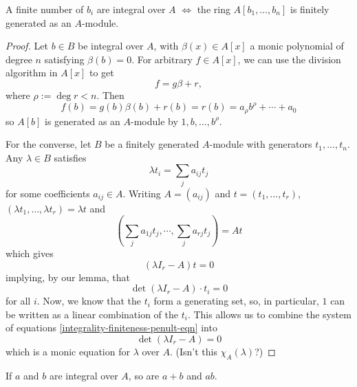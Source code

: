\begin{theorem}{\label{module-integrality}}
  A finite number of $b_i$ are integral over $A$ $\iff$ the ring
  $A[b_1,\ldots,b_n]$ is finitely generated as an $A$-module.
\end{theorem}
\begin{proof}
  Let $b\in B$ be integral over $A$, with $\beta(x) \in A[x]$ a monic
  polynomial of degree $n$ satisfying $\beta(b) = 0$. For arbitrary $f\in
  A[x]$, we can use the division algorithm in $A[x]$ to get \[f = g\beta + r,\]
  where $\rho := \deg r < n$.  Then \[f(b) = g(b)\beta(b) + r(b) = r(b) =
  a_\rho b^\rho + \cdots + a_0\] so $A[b]$ is generated as an $A$-module by $1,
  b, \ldots, b^\rho$.

  \medskip\noindent For the converse, let $B$ be a finitely generated
  $A$-module with generators $t_1,\ldots,t_n$. Any $\lambda \in B$ satisfies \[
  \lambda t_i = \sum_j a_{ij} t_j \] for some coefficients $a_{ij} \in A$.
  Writing $A = (a_{ij})$ and $t = (t_1,\ldots,t_r)$, $(\lambda
  t_1,\ldots,\lambda t_r) = \lambda t$ and \[ \left( \sum_j a_{1j} t_j, \cdots,
  \sum_j a_{rj} t_j \right) = At \]
  which gives
  \[ (\lambda I_r - A)t = 0 \]
  implying, by our lemma, that
  \begin{equation}%
    \label{integrality-finiteness-penult-eqn}
    \det(\lambda I_r - A) \cdot t_i = 0 
  \end{equation}
  for all $i$. Now, we know that the $t_i$ form a generating set, so, in
  particular, $1$ can be written as a linear combination of the $t_i$. This
  allows us to combine the system of equations
  \ref{integrality-finiteness-penult-eqn} into \[\det(\lambda I_r - A) = 0 \]
  which is a monic equation for $\lambda$ over $A$. (Isn't this $\chi_A(\lambda)$?)
\end{proof}

\begin{corollary}{\label{integrality-of-sums-products}}
  If $a$ and $b$ are integral over $A$, so are $a + b$ and $ab$.
\end{corollary}

